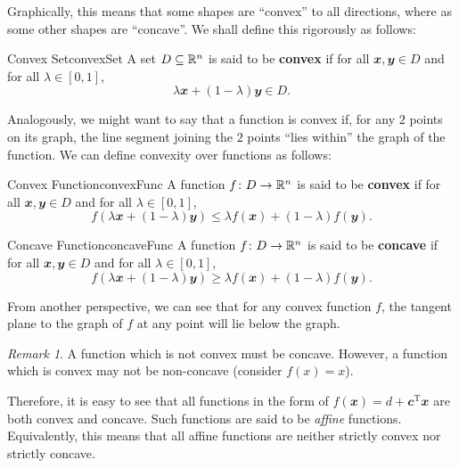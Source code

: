 \documentclass[math, code]{amznotes}
\theoremstyle{remark}
\newtheorem*{remark}{Remark}
\begin{document}
Graphically, this means that some shapes are ``convex'' to all directions, where as some other shapes are ``concave''. We shall define this rigorously as follows:
\begin{dfnbox}{Convex Set}{convexSet}
    A set $D \subseteq \mathbb{R}^n$ is said to be {\color{red} \textbf{convex}} if for all $\mathbfit{x}, \mathbfit{y} \in D$ and for all $\lambda \in [0, 1]$, 
    \begin{displaymath}
        \lambda \mathbfit{x} + (1 - \lambda)\mathbfit{y} \in D.
    \end{displaymath}
\end{dfnbox}
Analogously, we might want to say that a function is convex if, for any $2$ points on its graph, the line segment joining the $2$ points ``lies within'' the graph of the function. We can define convexity over functions as follows:
\begin{dfnbox}{Convex Function}{convexFunc}
    A function $f \colon D \to \mathbb{R}^n$ is said to be {\color{red} \textbf{convex}} if for all $\mathbfit{x}, \mathbfit{y} \in D$ and for all $\lambda \in [0, 1]$, 
    \begin{displaymath}
        f\left(\lambda \mathbfit{x} + (1 - \lambda)\mathbfit{y}\right) \leq \lambda f(\mathbfit{x}) + (1 - \lambda)f(\mathbfit{y}).
    \end{displaymath}
\end{dfnbox}
\begin{dfnbox}{Concave Function}{concaveFunc}
    A function $f \colon D \to \mathbb{R}^n$ is said to be {\color{red} \textbf{concave}} if for all $\mathbfit{x}, \mathbfit{y} \in D$ and for all $\lambda \in [0, 1]$, 
    \begin{displaymath}
        f\left(\lambda \mathbfit{x} + (1 - \lambda)\mathbfit{y}\right) \geq \lambda f(\mathbfit{x}) + (1 - \lambda)f(\mathbfit{y}).
    \end{displaymath}
\end{dfnbox}
From another perspective, we can see that for any convex function $f$, the tangent plane to the graph of $f$ at any point will lie below the graph.
\begin{notebox}
    \begin{remark}
        A function which is not convex must be concave. However, a function which is convex may not be non-concave (consider $f(x) = x$).
    \end{remark}
\end{notebox}
Therefore, it is easy to see that all functions in the form of $f(\mathbfit{x}) = d + \mathbfit{c}^{\mathrm{T}}\mathbfit{x}$ are both convex and concave. Such functions are said to be \textit{affine} functions. Equivalently, this means that all affine functions are neither strictly convex nor strictly concave.
\end{document}
